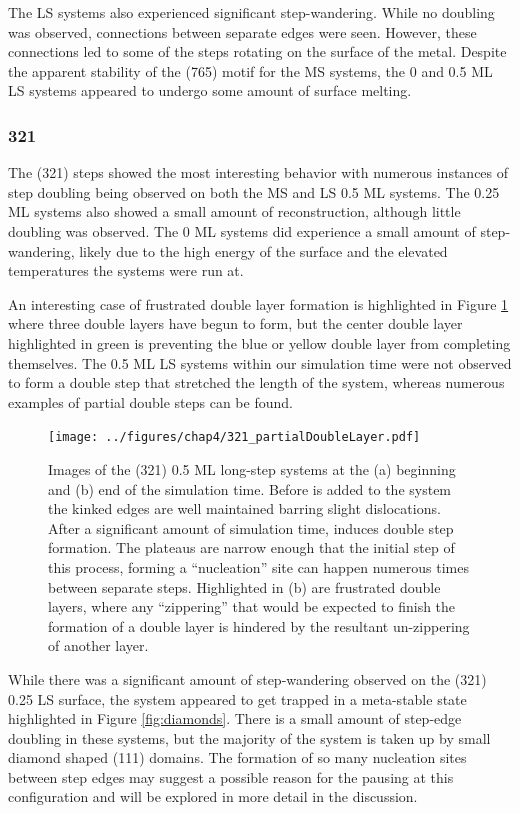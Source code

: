 The LS systems also experienced significant step-wandering. While no doubling
was observed, connections between separate edges were seen. However, these
connections led to some of the steps rotating on the surface of the metal.
Despite the apparent stability of the (765) motif for the MS systems, the 0 and
0.5 ML LS systems appeared to undergo some amount of surface melting.

\subsubsection{321}
The (321) steps showed the most interesting behavior with numerous instances of
step doubling being observed on both the MS and LS 0.5 ML systems. The 0.25 ML
systems also showed a small amount of reconstruction, although little doubling
was observed. The 0 ML systems did experience a small amount of step-wandering,
likely due to the high energy of the surface and the elevated temperatures the
systems were run at.

An interesting case of frustrated double layer formation is highlighted in
Figure \ref{fig:partialDoubleLayer} where three double layers have begun to form,
but the center double layer highlighted in green is preventing the blue or
yellow double layer from completing themselves. The 0.5 ML LS systems within
our simulation time were not observed to form a double step that stretched the
length of the system, whereas numerous examples of partial double steps can be
found.

\begin{figure}
\centering
\texttt{[image: ../figures/chap4/321\_partialDoubleLayer.pdf]}
\caption{Images of the (321) 0.5 ML long-step systems at the (a) beginning and
(b) end of the simulation time. Before  is added to the system the
kinked edges are well maintained barring slight dislocations. After a
significant amount of simulation time,  induces double step formation.
The plateaus are narrow enough that the initial step of this process, forming a
``nucleation'' site can happen numerous times between separate steps.
Highlighted in (b) are frustrated double layers, where any ``zippering'' that
would be expected to finish the formation of a double layer is hindered by the
resultant un-zippering of another layer.}
\label{fig:partialDoubleLayer}
\end{figure}

While there was a significant amount of step-wandering observed on the (321)
0.25 LS surface, the system appeared to get trapped in a meta-stable state
highlighted in Figure \ref{fig:diamonds}. There is a small amount of step-edge
doubling in these systems, but the majority of the system is taken up by small
diamond shaped (111) domains. The formation of so many nucleation sites between
step edges may suggest a possible reason for the pausing at this configuration
and will be explored in more detail in the discussion.

